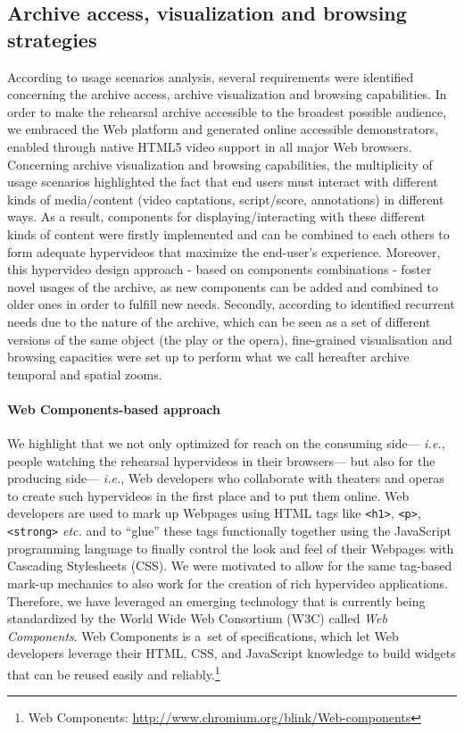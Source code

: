 \documentclass[conference]{IEEEtran}
\begin{document}
\subsection{Archive access, visualization and browsing strategies}
According to usage scenarios analysis, several requirements were identified concerning the archive access, archive visualization and browsing capabilities.
In order to make the rehearsal archive accessible to the broadest possible audience, we embraced the Web platform and generated online accessible demonstrators, enabled through native HTML5 video support in all major Web browsers.\newline
Concerning archive visualization and browsing capabilities, the multiplicity of usage scenarios highlighted the fact that end users must interact with different kinds of media/content (video captations, script/score, annotations) in different ways. As a result, components for displaying/interacting with these different kinds of content were firstly implemented and can be combined to each others to form adequate hypervideos that maximize the end-user's experience. Moreover, this hypervideo design approach - based on components combinations - foster novel usages of the archive, as new components can be added and combined to older ones in order to fulfill new needs.\newline
Secondly, according to identified recurrent needs due to the nature of the archive, which can be seen as a set of different versions of the same object (the play or the opera), fine-grained visualisation and browsing capacities were set up to perform what we call hereafter archive temporal and spatial zooms.

\paragraph{Web Components-based approach}
We highlight that we not only optimized for reach on the consuming side---%
\emph{i.e.}, people watching the rehearsal hypervideos in their browsers---%
but also for the producing side---%
\emph{i.e.}, Web developers who collaborate with theaters and operas
to create such hypervideos in the first place and to put them online.
Web developers are used to mark up Webpages using HTML tags
like \texttt{<h1>}, \texttt{<p>}, \texttt{<strong>} \emph{etc.}
and to ``glue'' these tags functionally together using the JavaScript programming language
to finally control the look and feel of their Webpages with Cascading Stylesheets (CSS).
We were motivated to allow for the same tag-based mark-up mechanics
to also work for the creation of rich hypervideo applications.
Therefore, we have leveraged an emerging technology
that is currently being standardized by the World Wide Web Consortium (W3C)
called \emph{Web Components}.
Web Components is a~set of specifications, which let Web developers leverage
their HTML, CSS, and JavaScript knowledge to build widgets
that can be reused easily and reliably.\footnote{Web Components:
\url{http://www.chromium.org/blink/Web-components}}
\end{document}
